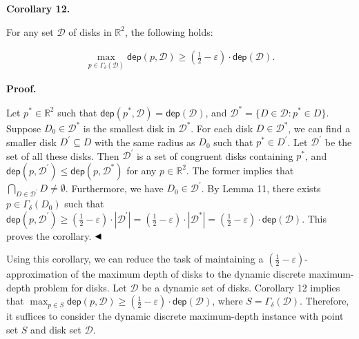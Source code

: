\documentclass[10pt,a4paper]{article}
\begin{document}
\par
\par
\par\medskip\noindent\textbf{Corollary 12.}\par
For any set $\mathcal{D}$ of disks in $\mathbb{R}^{2}$, the following holds:
\par
\[\begin{aligned}
\max_{p\in\varGamma_{\delta}(\mathcal{D})}\mathsf{dep}(p,\mathcal{D})\geq\left%
(\frac{1}{2}-\varepsilon\right)\cdot\mathsf{dep}(\mathcal{D}).
\end{aligned}\]
\par
\par
\par\medskip\noindent\textbf{Proof.}\par
Let $p^{*}\in\mathbb{R}^{2}$ such that $\mathsf{dep}(p^{*},\mathcal{D})=\mathsf{dep}(\mathcal{D})$, and $\mathcal{D}^{*}=\{D\in\mathcal{D}:p^{*}\in D\}$. Suppose $D_{0}\in\mathcal{D}^{*}$ is the smallest disk in $\mathcal{D}^{*}$. For each disk $D\in\mathcal{D}^{*}$, we can find a smaller disk $D^{\prime}\subseteq D$ with the same radius as $D_{0}$ such that $p^{*}\in D^{\prime}$. Let $\mathcal{D}^{\prime}$ be the set of all these disks. Then $\mathcal{D}^{\prime}$ is a set of congruent disks containing $p^{*}$, and $\mathsf{dep}(p,\mathcal{D}^{\prime})\leq\mathsf{dep}(p,\mathcal{D}^{*})$ for any $p\in\mathbb{R}^{2}$. The former implies that $\bigcap_{D\in\mathcal{D}^{\prime}}D\neq\emptyset$. Furthermore, we have $D_{0}\in\mathcal{D}^{\prime}$. By Lemma 11, there exists $p\in\varGamma_{\delta}(D_{0})$ such that $\mathsf{dep}(p,\mathcal{D}^{\prime})\geq(\frac{1}{2}-\varepsilon)\cdot|%
\mathcal{D}^{\prime}|=(\frac{1}{2}-\varepsilon)\cdot|\mathcal{D}^{*}|=(\frac{1%
}{2}-\varepsilon)\cdot\mathsf{dep}(\mathcal{D})$. This proves the corollary. $\hfill\blacktriangleleft$
\par
\par
Using this corollary, we can reduce the task of maintaining a $(\frac{1}{2}-\varepsilon)$-approximation of the maximum depth of disks to the dynamic discrete maximum-depth problem for disks. Let $\mathcal{D}$ be a dynamic set of disks. Corollary 12 implies that $\max_{p\in S}\mathsf{dep}(p,\mathcal{D})\geq(\frac{1}{2}-\varepsilon)\cdot%
\mathsf{dep}(\mathcal{D})$, where $S=\varGamma_{\delta}(\mathcal{D})$. Therefore, it suffices to consider the dynamic discrete maximum-depth instance with point set $S$ and disk set $\mathcal{D}$.
\end{document}
